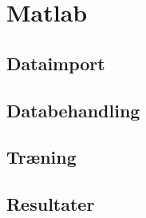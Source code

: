 \thispagestyle{fancy}
\chapter{Matlab}
\label{chp:matlabChapter}

\section{Dataimport}

\section{Databehandling}

\section{Træning}

\section{Resultater}